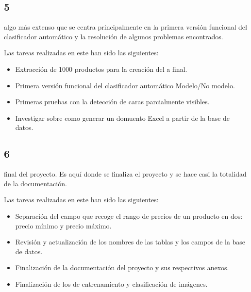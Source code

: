 \subsection{ 5} %
 algo más extenso que se centra principalmente en la primera versión funcional del clasificador automático y la resolución de algunos problemas encontrados.


Las tareas realizadas en este  han sido las siguientes:

\begin{itemize}
    \item Extracción de 1000 productos para la creación del a final.
    \item Primera versión funcional del clasificador automático Modelo/No modelo.
    \item Primeras pruebas con la detección de caras parcialmente visibles.
    \item Investigar sobre como generar un domuento Excel a partir de la base de datos.
\end{itemize}


\subsection{ 6} %
 final del proyecto. Es aquí donde se finaliza el proyecto y se hace casi la totalidad de la documentación.


Las tareas realizadas en este  han sido las siguientes:

\begin{itemize}
    \item Separación del campo que recoge el rango de precios de un producto en dos: precio mínimo y precio máximo.
    \item Revisión y actualización de los nombres de las tablas y los campos de la base de datos.
    \item Finalización de la documentación del proyecto y sus respectivos anexos.
    \item Finalización de los  de entrenamiento y clasificación de imágenes.
\end{itemize}



